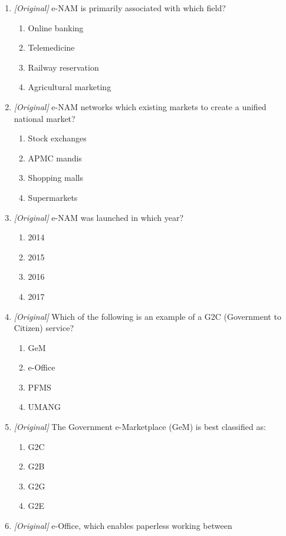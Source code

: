 \documentclass[11pt]{article}
\begin{document}
\begin{enumerate}[label=\textbf{Q\arabic*.}, leftmargin=*]
\begin{enumerate}[label=\Alph*.]
  \end{enumerate}
\item \textit{[Original]} e-NAM is primarily associated with which field?
  \begin{enumerate}[label=\Alph*.]
    \item Online banking
    \item Telemedicine
    \item Railway reservation
    \item Agricultural marketing
  \end{enumerate}
\item \textit{[Original]} e-NAM networks which existing markets to create a
  unified national market?
  \begin{enumerate}[label=\Alph*.]
    \item Stock exchanges
    \item APMC mandis
    \item Shopping malls
    \item Supermarkets
  \end{enumerate}
\item \textit{[Original]} e-NAM was launched in which year?
  \begin{enumerate}[label=\Alph*.]
    \item 2014
    \item 2015
    \item 2016
    \item 2017
  \end{enumerate}
\item \textit{[Original]} Which of the following is an example of a G2C
  (Government to Citizen) service?
  \begin{enumerate}[label=\Alph*.]
    \item GeM
    \item e-Office
    \item PFMS
    \item UMANG
  \end{enumerate}
\item \textit{[Original]} The Government e-Marketplace (GeM) is best
  classified as:
  \begin{enumerate}[label=\Alph*.]
    \item G2C
    \item G2B
    \item G2G
    \item G2E
  \end{enumerate}
\item \textit{[Original]} e-Office, which enables paperless working between

\end{enumerate}
\end{document}
